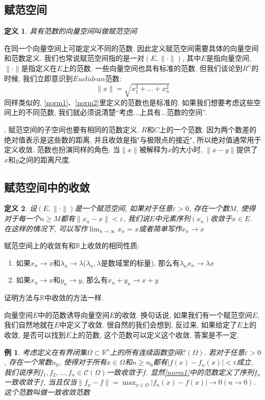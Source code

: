 \documentclass[a4paper,11pt]{book}
\newtheorem{definition}{\hspace{2em}定义}[section]
\newtheorem{example}{例}[section]
\begin{document}
\subsection*{赋范空间}
\begin{definition}
  具有范数的向量空间叫做赋范空间
\end{definition}
在同一个向量空间上可能定义不同的范数. 因此定义赋范空间需要具体的向量空间和范数定义. 我们也常说赋范空间指的是一对$(E,\|\cdot\|)$, 其中$E$是指向量空间, $\|\cdot\|$是指定义在$E$上的范数. 一些向量空间也具有标准的范数. 但我们谈论到$R^n$的时候, 我们立即意识到$Euclidean$范数:
\begin{equation*}
  \|x\|=\sqrt{x_1^2+\dots+x_n^2}
\end{equation*}
同样类似的, \ref{norm1}、\ref{norm2}里定义的范数也是标准的. 如果我们想要考虑这些空间上的不同范数, 我们就必须说清楚“考虑$\dots$上具有$\dots$范数的空间”.

, 赋范空间的子空间也要有相同的范数定义.
$R$和$C$上的一个范数. 因为两个数差的绝对值表示是这些数的距离, 并且收敛是指"与极限点的接近", 所以绝对值通常用于定义收敛. 范数也扮演同样的角色. 当$\|x\|$被解释为$x$的大小时, $\|x-y\|$提供了$x$和$y$之间的距离尺度.
\subsection*{赋范空间中的收敛}
\begin{definition}
  设$(E,\|\cdot\|)$是一个赋范空间, 如果对于任意$\varepsilon>0$, 存在一个数$M$, 使得对于每一个$n\geq M$都有$\|x_n-x\|<\varepsilon$, 我们说$E$中元素序列$(x_n)$收敛于$x\in E$. 在这样的情况下, 可以写作$\lim_{n\to \infty} x_n=x$或者简单写作$x_n\to x$
\end{definition}
赋范空间上的收敛有和$\mathbb{R}$上收敛的相同性质:
\begin{enumerate}
  \item 如果$x_n\to x$和$\lambda_n\to\lambda$($\lambda_n,\lambda$是数域里的标量), 那么有$\lambda_n x_n\to\lambda x$
  \item 如果$x_n\to x$和$y_n\to y$, 那么有$x_n+y_n\to x+y$
\end{enumerate}
证明方法与$\mathbb{R}$中收敛的方法一样.

\indent 向量空间$E$中的范数诱导向量空间$E$的收敛. 换句话说, 如果我们有一个赋范空间$E$,我们自然地就在$E$中定义了收敛. 很自然的我们会想到, 反过来, 如果给定了$E$上的收敛, 是否可以找到$E$上的范数, 这个范数可以定义这个收敛. 答案是不一定.
\begin{example}
  考虑定义在有界闭集$\Omega\subset \mathbb{R}^n$上的所有连续函数空间$\mathcal{C}(\Omega)$. 若对于任意$\varepsilon>0$, 存在一个常数$n_0$, 使得对于所有$x\in\Omega$和$n\geq n_0$都有$|f(x)-f_n(x)|<\varepsilon$成立, 我们说序列$f_1,f_2,\dots,f_n\in\mathcal{C}(\Omega)$一致收敛于$f$. 显然\ref{norm1}中的范数定义了序列$f_n$一致收敛于$f$, 当且仅当$\|f_n-f\|=\max_{x\in\Omega}|f_n(x)-f(x)|\to 0(n\to 0)$. 这个范数叫做一致收敛范数
\end{example}
\end{document}
